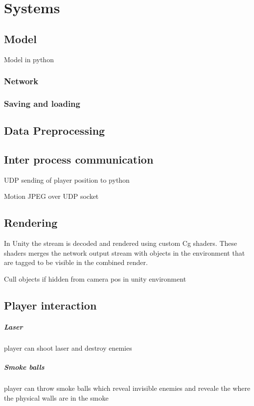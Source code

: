 
\chapter{Systems}
\section{Model}
Model in python

\subsection{Network} \label{Network}


\subsection{Saving and loading}
\section{Data Preprocessing}
\section{Inter process communication}
UDP sending of player position to python

Motion JPEG over UDP socket

\section{Rendering}
In Unity the stream is decoded and rendered using custom Cg shaders. These shaders merges the network output stream with objects in the environment that are tagged to be visible in the combined render.

Cull objects if hidden from camera pos in unity environment

\section{Player interaction}
\paragraph{Laser}
player can shoot laser and destroy enemies

\paragraph{Smoke balls}
player can throw smoke balls which reveal invisible enemies and reveale the where the physical walls are in the smoke
